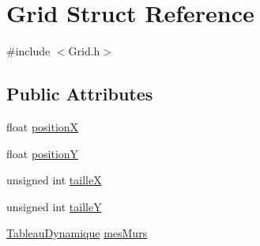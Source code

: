 \hypertarget{structGrid}{\section{Grid Struct Reference}
\label{structGrid}
}


{\ttfamily \#include $<$Grid.\-h$>$}

\subsection*{Public Attributes}
\begin{DoxyCompactItemize}
\item 
float \hyperlink{structGrid_a1712b348175d1449f924218abc2c180b}{position\-X}
\item 
float \hyperlink{structGrid_aa084d4ec2894df907e02718c88ab4060}{position\-Y}
\item 
unsigned int \hyperlink{structGrid_ad6ec58066a6303fbc2aa5443840cf067}{taille\-X}
\item 
unsigned int \hyperlink{structGrid_adc12ffc8da211af2444db8a2007e5a7d}{taille\-Y}
\item 
\hyperlink{structTableauDynamique}{Tableau\-Dynamique} \hyperlink{structGrid_a3e5062eabb47200f6c3638903c2b5303}{mes\-Murs}
\end{DoxyCompactItemize}


